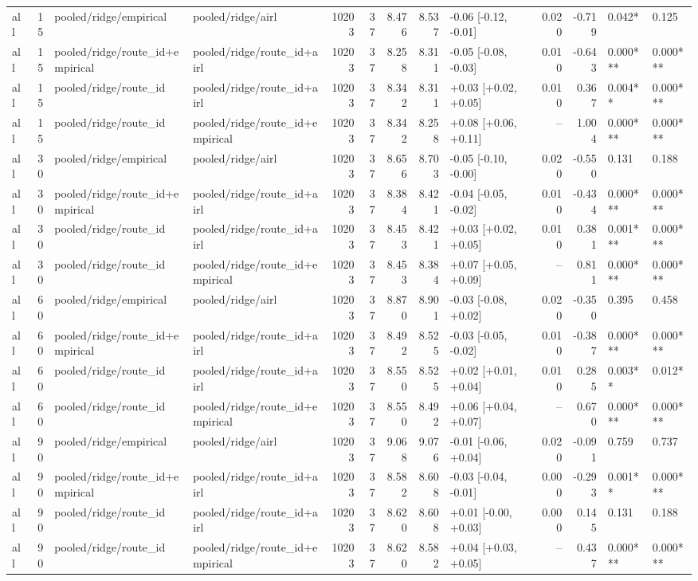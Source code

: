 \begin{tabular}{lrllrrrrlrrll}
all & 15 & pooled/ridge/empirical & pooled/ridge/airl & 10203 & 37 & 8.476 & 8.537 & -0.06 [-0.12, -0.01] & 0.020 & -0.719 & 0.042* & 0.125 \\
all & 15 & pooled/ridge/route_id+empirical & pooled/ridge/route_id+airl & 10203 & 37 & 8.258 & 8.311 & -0.05 [-0.08, -0.03] & 0.010 & -0.643 & 0.000*** & 0.000*** \\
all & 15 & pooled/ridge/route_id & pooled/ridge/route_id+airl & 10203 & 37 & 8.342 & 8.311 & +0.03 [+0.02, +0.05] & 0.010 & 0.367 & 0.004** & 0.000*** \\
all & 15 & pooled/ridge/route_id & pooled/ridge/route_id+empirical & 10203 & 37 & 8.342 & 8.258 & +0.08 [+0.06, +0.11] & -- & 1.004 & 0.000*** & 0.000*** \\
all & 30 & pooled/ridge/empirical & pooled/ridge/airl & 10203 & 37 & 8.656 & 8.703 & -0.05 [-0.10, -0.00] & 0.020 & -0.550 & 0.131 & 0.188 \\
all & 30 & pooled/ridge/route_id+empirical & pooled/ridge/route_id+airl & 10203 & 37 & 8.384 & 8.421 & -0.04 [-0.05, -0.02] & 0.010 & -0.434 & 0.000*** & 0.000*** \\
all & 30 & pooled/ridge/route_id & pooled/ridge/route_id+airl & 10203 & 37 & 8.453 & 8.421 & +0.03 [+0.02, +0.05] & 0.010 & 0.381 & 0.001*** & 0.000*** \\
all & 30 & pooled/ridge/route_id & pooled/ridge/route_id+empirical & 10203 & 37 & 8.453 & 8.384 & +0.07 [+0.05, +0.09] & -- & 0.811 & 0.000*** & 0.000*** \\
all & 60 & pooled/ridge/empirical & pooled/ridge/airl & 10203 & 37 & 8.870 & 8.901 & -0.03 [-0.08, +0.02] & 0.020 & -0.350 & 0.395 & 0.458 \\
all & 60 & pooled/ridge/route_id+empirical & pooled/ridge/route_id+airl & 10203 & 37 & 8.492 & 8.525 & -0.03 [-0.05, -0.02] & 0.010 & -0.387 & 0.000*** & 0.000*** \\
all & 60 & pooled/ridge/route_id & pooled/ridge/route_id+airl & 10203 & 37 & 8.550 & 8.525 & +0.02 [+0.01, +0.04] & 0.010 & 0.285 & 0.003** & 0.012* \\
all & 60 & pooled/ridge/route_id & pooled/ridge/route_id+empirical & 10203 & 37 & 8.550 & 8.492 & +0.06 [+0.04, +0.07] & -- & 0.670 & 0.000*** & 0.000*** \\
all & 90 & pooled/ridge/empirical & pooled/ridge/airl & 10203 & 37 & 9.068 & 9.076 & -0.01 [-0.06, +0.04] & 0.020 & -0.091 & 0.759 & 0.737 \\
all & 90 & pooled/ridge/route_id+empirical & pooled/ridge/route_id+airl & 10203 & 37 & 8.582 & 8.608 & -0.03 [-0.04, -0.01] & 0.000 & -0.293 & 0.001** & 0.000*** \\
all & 90 & pooled/ridge/route_id & pooled/ridge/route_id+airl & 10203 & 37 & 8.620 & 8.608 & +0.01 [-0.00, +0.03] & 0.000 & 0.145 & 0.131 & 0.188 \\
all & 90 & pooled/ridge/route_id & pooled/ridge/route_id+empirical & 10203 & 37 & 8.620 & 8.582 & +0.04 [+0.03, +0.05] & -- & 0.437 & 0.000*** & 0.000*** \\
\bottomrule
\end{tabular}
